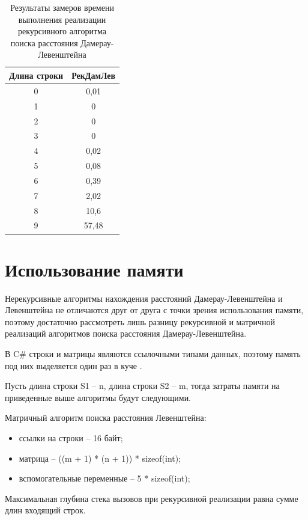 \begin{table}[H]
	\begin{center}
		\caption{\label{tab:time2}Результаты замеров времени выполнения реализации рекурсивного алгоритма поиска расстояния Дамерау-Левенштейна}
		\begin{tabular}{|c|c|}
			\hline
			Длина строки&РекДамЛев \\
			\hline
			0&	0,01\\
			\hline
			1&	0\\
			\hline
			2&	0\\
			\hline
			3&	0\\
			\hline
			4&	0,02\\
			\hline
			5&	0,08\\
			\hline
			6&	0,39\\
			\hline
			7&	2,02\\
			\hline
			8& 10,6\\
			\hline
			9&	57,48\\
			\hline
		\end{tabular}
	\end{center}
\end{table}

 
\section{Использование памяти}

Нерекурсивные алгоритмы нахождения расстояний Дамерау-Левенштейна и Левенштейна не отличаются друг от друга с точки зрения использования памяти, поэтому достаточно рассмотреть лишь разницу рекурсивной и матричной реализаций алгоритмов поиска расстояния Дамерау-Левенштейна.

В C\# строки и матрицы являются ссылочными типами данных, поэтому память под них выделяется один раз в куче \cite{referencetypes}.

Пусть длина строки S1 -- n, длина строки S2 -- m, тогда затраты памяти на приведенные выше алгоритмы будут следующими.

Матричный алгоритм поиска расстояния Левенштейна: 
	\begin{itemize}
		\item ссылки на строки -- 16 байт;
		\item матрица -- ((m + 1) * (n + 1)) * sizeof(int);
		\item вспомогательные переменные --  5 * sizeof(int);
	\end{itemize}

Максимальная глубина стека вызовов при рекурсивной реализации равна сумме длин входящий строк. 

